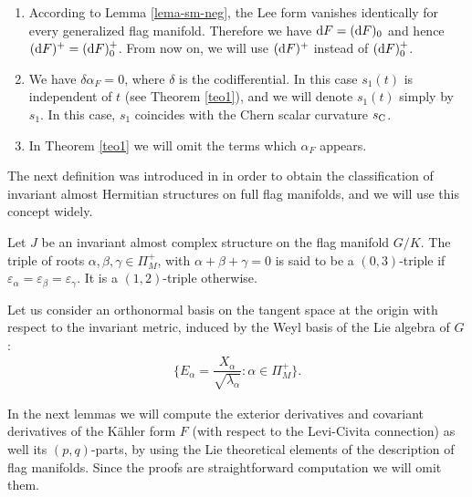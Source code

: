 \documentclass[pdftex]{sigma}%
\numberwithin{equation}{section}
\begin{document}
{\samepage\begin{Remark}\quad
\begin{enumerate}\itemsep=0pt
\item[1.] According to Lemma \ref{lema-sm-neg}, the Lee form vanishes identically for every generalized flag manifold. Therefore we have ${\rm d}F=({\rm d}F)_{0}$ and hence $({\rm d}F)^{+}=({\rm d}F)_{0}^{+}$. From now on, we will use $({\rm d}F)^{+}$ instead of $({\rm d}F)_{0}^{+}$.

\item[2.] We have $\delta \alpha_{F}=0$, where $\delta$ is the codifferential. In this case $s_{1}(t)$ is independent of $t$ (see Theorem \ref{teo1}), and we will denote $s_{1}(t)$ simply by $s_{1}$. In this case, $s_1$ coincides with the Chern scalar curvature $s_{\rm C}$.

\item[3.] In Theorem \ref{teo1} we will omit the terms which $\alpha_{F}$ appears.
\end{enumerate}
\end{Remark}

}

The next definition was introduced in \cite{sn} in order to obtain the classification of invariant almost Hermitian structures on full flag manifolds, and we will use this concept widely.

\begin{Definition}
Let $J$ be an invariant almost complex structure on the flag manifold $G/K$. The triple of roots $\alpha, \beta, \gamma\in \Pi^+_M$, with $\alpha+\beta+\gamma=0$ is said to be a $(0,3)$-triple if $\varepsilon_\alpha=\varepsilon_\beta=\varepsilon_\gamma$. It is a $(1,2)$-triple otherwise.
\end{Definition}

Let us consider an orthonormal basis on the tangent space at the origin with respect to the invariant metric, induced by the Weyl basis of the Lie algebra of $G$:
\begin{gather*}
\bigg\{E_{\alpha}=\dfrac{X_{\alpha}}{\sqrt{\lambda_{\alpha}}}\colon \alpha\in \Pi_{M}^{+}\bigg\}.
\end{gather*}

In the next lemmas we will compute the exterior derivatives and covariant derivatives of the K\"ahler form $F$ (with respect to the Levi-Civita connection) as well its $(p,q)$-parts, by using the Lie theoretical elements of the description of flag manifolds. Since the proofs are straightforward computation we will omit them.
\end{document}
